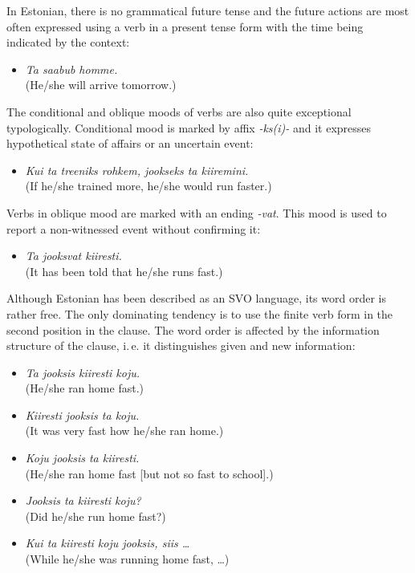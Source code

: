 \begin{multicols}{2}
In Estonian, there is no grammatical future tense and the future actions are most often expressed using a verb in a present tense form with the time being indicated by the context:

\begin{itemize}
\item[] \textit{Ta saabub homme.}\\
  (He/she will arrive tomorrow.)
\end{itemize}

The conditional and oblique moods of verbs are also quite exceptional typologically. 
Conditional mood is marked by affix \textit{-ks(i)-} and it expresses
hypothetical state of affairs or an uncertain event: 

\begin{itemize}
\item[] \textit{Kui ta treeniks rohkem, jookseks ta kiire\-mini.}\\
  (If he/she trained more, he/she would run faster.)  
\end{itemize}

Verbs in oblique mood are marked with an ending \textit{-vat}. 
This mood is used to report a non-witnessed event without conﬁrming it:

\begin{itemize}
\item[] \textit{Ta jooksvat kiiresti.}\\
  (It has been told that he/she runs fast.)
\end{itemize}

Although Estonian has been described as an SVO language, its word order is rather free. 
The only dominating tendency is to use the ﬁnite verb form in the second position in the clause. 
The word order is affected by the information structure of the clause,
i.\,e. it distinguishes given and new information:

\begin{itemize}
\item \textit{Ta jooksis kiiresti koju.}\\
  (He/she ran home fast.)
\item \textit{Kiiresti jooksis ta koju.}\\
  (It was very fast how he/she ran home.)
\item \textit{Koju jooksis ta kiiresti.}\\
  (He/she ran home fast [but not so fast to school].)
\item \textit{Jooksis ta kiiresti koju?}\\
  (Did he/she run home fast?)
\item \textit{Kui ta kiiresti koju jooksis, siis \ldots}\\
  (While he/she was running home fast, \ldots)
\end{itemize}


\end{multicols}
